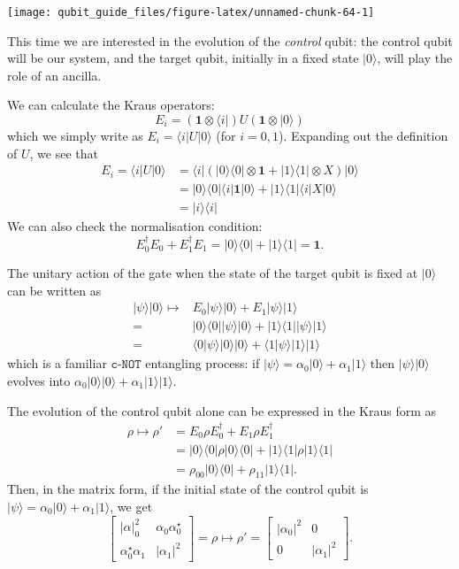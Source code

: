 \documentclass[fleqn]{article}
\begin{document}
\begin{center}\texttt{[image: qubit\_guide\_files/figure-latex/unnamed-chunk-64-1]} \end{center}

This time we are interested in the evolution of the \emph{control} qubit: the control qubit will be our system, and the target qubit, initially in a fixed state \(|0\rangle\), will play the role of an ancilla.

We can calculate the Kraus operators:
\[
  E_i = (\mathbf{1}\otimes\langle i|) U (\mathbf{1}\otimes|0\rangle)
\]
which we simply write as \(E_i=\langle i|U|0\rangle\) (for \(i=0,1\)).
Expanding out the definition of \(U\), we see that
\[
  \begin{aligned}
    E_i = \langle i|U|0\rangle
    &= \langle i| (|0\rangle\langle 0|\otimes\mathbf{1}+ |1\rangle\langle 1|\otimes X) |0\rangle
  \\&= |0\rangle\langle 0|\langle i|\mathbf{1}|0\rangle + |1\rangle\langle 1|\langle i|X|0\rangle
  \\&= |i\rangle\langle i|
\end{aligned}
\]
We can also check the normalisation condition:
\[
  E_0^\dagger E_0 + E_1^\dagger E_1
  = |0\rangle\langle 0| + |1\rangle\langle 1|
  =\mathbf{1}.
\]

The unitary action of the gate when the state of the target qubit is fixed at \(|0\rangle\) can be written as
\[
  \begin{aligned}
    |\psi\rangle|0\rangle
    \longmapsto
    & E_0|\psi\rangle|0\rangle + E_1|\psi\rangle|1\rangle
  \\=& |0\rangle\langle 0||\psi\rangle|0\rangle + |1\rangle\langle 1||\psi\rangle|1\rangle
  \\=& \langle 0|\psi\rangle|0\rangle|0\rangle + \langle 1|\psi\rangle|1\rangle|1\rangle
  \end{aligned}
\]
which is a familiar \(\texttt{c-NOT}\) entangling process: if \(|\psi\rangle=\alpha_0|0\rangle+\alpha_1|1\rangle\) then \(|\psi\rangle|0\rangle\) evolves into \(\alpha_0|0\rangle|0\rangle+\alpha_1|1\rangle|1\rangle\).

The evolution of the control qubit alone can be expressed in the Kraus form as
\[
  \begin{aligned}
    \rho \longmapsto \rho'
    &= E_0\rho E_0^\dagger + E_1\rho E_1^\dagger
  \\&= |0\rangle\langle 0|\rho|0\rangle\langle 0| + |1\rangle\langle 1|\rho|1\rangle\langle 1|
  \\&= \rho_{00}|0\rangle\langle 0| + \rho_{11}|1\rangle\langle 1|.
  \end{aligned}
\]
Then, in the matrix form, if the initial state of the control qubit is \(|\psi\rangle=\alpha_0|0\rangle+\alpha_1|1\rangle\), we get
\[
  \begin{bmatrix}
    |\alpha|_0^2 & \alpha_0\alpha_0^\star
  \\\alpha_0^\star\alpha_1 & |\alpha_1|^2
  \end{bmatrix}
  = \rho
  \longmapsto
  \rho' =
  \begin{bmatrix}
    |\alpha_0|^2 & 0
  \\0 & |\alpha_1|^2
  \end{bmatrix}.
\]
\end{document}
